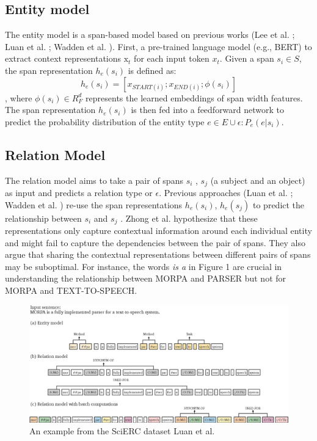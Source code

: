 \subsection{Entity model} The entity model is a span-based model based on previous works (Lee et al. \cite{lee-etal-2017-end}; Luan et al. \cite{luan-etal-2019-general}; Wadden et al. \cite{Wadden2019EntityRA}). First, a pre-trained language model (e.g., BERT) to extract context representations \(\text{x}_t\) for each input token \(x_t\). Given a span \(s_i \in S\), the span representation \(h_e(s_i)\) is defined as: \[h_e(s_i) = [x_{START(i)} ; x_{END(i)} ; \phi(s_i)]\], where \(\phi(s_i) \in R^d_F\) represents the learned embeddings of span width features. The span representation \(h_e(s_i)\) is then fed into a feedforward network to predict the probability distribution of the entity type \(e \in E \cup {\epsilon}: P_e(e | s_i)\).

\subsection{Relation Model}
The relation model aims to take a pair of spans \(s_i\) , \(s_j\) (a subject and an object) as input and predicts a relation type or \(\epsilon\). Previous approaches (Luan et al. \cite{luan-etal-2019-general}; Wadden et al. \cite{Wadden2019EntityRA}) re-use the span representations \(h_e(s_i)\), \(h_e(s_j)\) to predict the relationship between \(s_i\) and \(s_j\) . Zhong et al. \cite{Zhong2020AFE} hypothesize that these representations only capture contextual information around each individual entity and might fail to capture the dependencies between the pair of spans. They also argue that sharing the contextual representations between different pairs of spans may be suboptimal. For instance, the words \textit{is a} in Figure 1 are crucial in understanding the relationship between MORPA and PARSER but not for MORPA and TEXT-TO-SPEECH.

\begin{figure}[ht]
    \centering
    \includegraphics[width=1\textwidth]{figures/figure1.png}
    \caption{An example from the SciERC dataset Luan et al. \cite{luan-etal-2019-general}}
    \label{fig:examplefromsciercdataset}
\end{figure}


